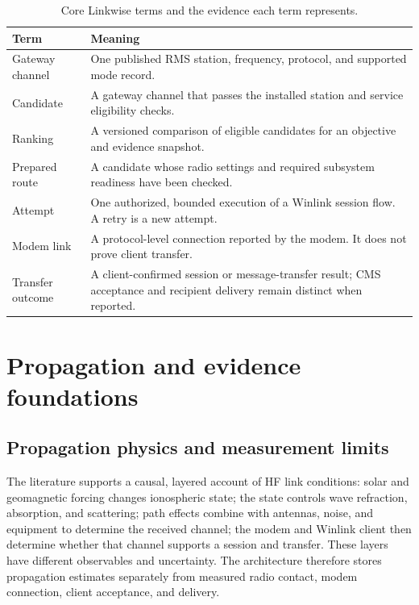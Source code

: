 \documentclass[11pt,a4paper]{article}
\begin{document}
\begin{table}[htbp]
\centering
\caption{Core Linkwise terms and the evidence each term represents.}
\label{tab:linkwise-terms}
\begin{tabularx}{\linewidth}{@{}p{1.35in}X@{}}
\toprule
\textbf{Term} & \textbf{Meaning} \\
\midrule
Gateway channel & One published RMS station, frequency, protocol, and supported mode record. \\
Candidate & A gateway channel that passes the installed station and service eligibility checks. \\
Ranking & A versioned comparison of eligible candidates for an objective and evidence snapshot. \\
Prepared route & A candidate whose radio settings and required subsystem readiness have been checked. \\
Attempt & One authorized, bounded execution of a Winlink session flow. A retry is a new attempt. \\
Modem link & A protocol-level connection reported by the modem. It does not prove client transfer. \\
Transfer outcome & A client-confirmed session or message-transfer result; CMS acceptance and recipient delivery remain distinct when reported. \\
\bottomrule
\end{tabularx}
\end{table}

\section{Propagation and evidence foundations}
\subsection{Propagation physics and measurement limits}
The literature supports a causal, layered account of HF link conditions:
solar and geomagnetic forcing changes ionospheric state; the state controls
wave refraction, absorption, and scattering; path effects combine with
antennas, noise, and equipment to determine the received channel; the modem
and Winlink client then determine whether that channel supports a session and
transfer. These layers have different observables and uncertainty. The
architecture therefore stores propagation estimates separately from measured
radio contact, modem connection, client acceptance, and delivery.
\end{document}
